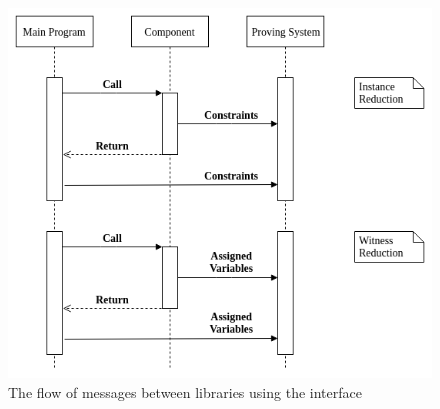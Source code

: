 	
		\begin{figure}[h!]
			\includegraphics[width=\linewidth]{call_flow.png}
			\caption{The flow of messages between libraries using the interface}
			\label{flow}
		\end{figure}
